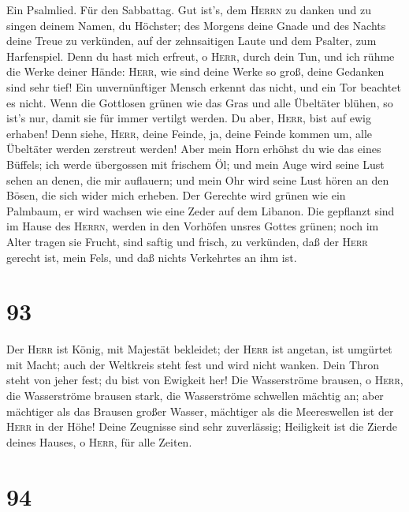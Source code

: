  Ein Psalmlied. Für den Sabbattag. Gut ist's, dem
\textsc{Herrn} zu danken und zu singen deinem Namen, du Höchster;
 des Morgens deine Gnade und des Nachts deine Treue zu
verkünden,  auf der zehnsaitigen Laute und dem Psalter,
zum Harfenspiel.  Denn du hast mich erfreut, o
\textsc{Herr}, durch dein Tun, und ich rühme die Werke deiner Hände:
 \textsc{Herr}, wie sind deine Werke so groß, deine
Gedanken sind sehr tief!  Ein unvernünftiger Mensch
erkennt das nicht, und ein Tor beachtet es nicht.  Wenn
die Gottlosen grünen wie das Gras und alle Übeltäter blühen, so ist's
nur, damit sie für immer vertilgt werden.  Du aber,
\textsc{Herr}, bist auf ewig erhaben!  Denn siehe,
\textsc{Herr}, deine Feinde, ja, deine Feinde kommen um, alle Übeltäter
werden zerstreut werden!  Aber mein Horn erhöhst du wie
das eines Büffels; ich werde übergossen mit frischem Öl; 
und mein Auge wird seine Lust sehen an denen, die mir auflauern; und
mein Ohr wird seine Lust hören an den Bösen, die sich wider mich
erheben.  Der Gerechte wird grünen wie ein Palmbaum, er
wird wachsen wie eine Zeder auf dem Libanon.  Die
gepflanzt sind im Hause des \textsc{Herrn}, werden in den Vorhöfen
unsres Gottes grünen;  noch im Alter tragen sie Frucht,
sind saftig und frisch,  zu verkünden, daß der
\textsc{Herr} gerecht ist, mein Fels, und daß nichts Verkehrtes an ihm
ist.

\hypertarget{section-92}{%
\section{93}\label{section-92}}

 Der \textsc{Herr} ist König, mit Majestät bekleidet; der
\textsc{Herr} ist angetan, ist umgürtet mit Macht; auch der Weltkreis
steht fest und wird nicht wanken.  Dein Thron steht von
jeher fest; du bist von Ewigkeit her!  Die Wasserströme
brausen, o \textsc{Herr}, die Wasserströme brausen stark, die
Wasserströme schwellen mächtig an;  aber mächtiger als das
Brausen großer Wasser, mächtiger als die Meereswellen ist der
\textsc{Herr} in der Höhe!  Deine Zeugnisse sind sehr
zuverlässig; Heiligkeit ist die Zierde deines Hauses, o \textsc{Herr},
für alle Zeiten.

\hypertarget{section-93}{%
\section{94}\label{section-93}}

